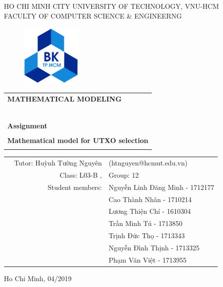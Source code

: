 \documentclass[a4paper]{article}
\begin{document}
\begin{titlepage}

\begin{center}
HO CHI MINH CITY UNIVERSITY OF TECHNOLOGY, VNU-HCM\\
FACULTY OF COMPUTER SCIENCE \& ENGINEERNG
\end{center}

\vspace{1cm}

\begin{figure}[h!]
\begin{center}
\includegraphics[width=3cm]{hcmut.png}
\end{center}
\end{figure}

\vspace{1cm}


\begin{center}
\begin{tabular}{c}
\multicolumn{1}{l}{\textbf{{\Large MATHEMATICAL MODELING}}}\\
~~\\
\hline
\\
\multicolumn{1}{l}{\textbf{{\Large Assignment}}}\\
\\
\textbf{\Huge Mathematical model for UTXO selection}\\
\\
\hline
\end{tabular}
\end{center}

\vspace{3cm}

\begin{table}[h]
\begin{tabular}{rrl}

\hspace{5 cm} & Tutor: Huỳnh Tường Nguyên & (htnguyen@hcmut.edu.vn)\\
& Class: L03-B	, & Group: 12\\
& Student members: & Nguyễn Linh Đăng Minh - 1712177 \\
& & Cao Thành Nhân - 1710214 \\
& & Lương Thiện Chí - 1610304 \\
& & Trần Minh Tú - 1713850 \\
& & Trịnh Đức Thọ - 1713343 \\
& & Nguyễn Đình Thịnh - 1713325 \\
& & Phạm Văn Việt - 1713955 \\
\end{tabular}
\end{table}

\begin{center}
{\footnotesize Ho Chi Minh, 04/2019}
\end{center}
\end{titlepage}
\end{document}
